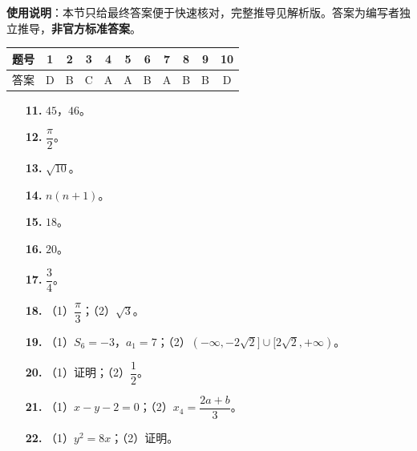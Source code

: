 
\begin{gknotice}
\textbf{使用说明}：本节只给最终答案便于快速核对，完整推导见解析版。答案为编写者独立推导，\textbf{非官方标准答案}。
\end{gknotice}

\begin{center}\begin{tabular}{ccccccccccc}
\toprule
题号 & 1 & 2 & 3 & 4 & 5 & 6 & 7 & 8 & 9 & 10 \\
\midrule
答案 & D & B & C & A & A & B & A & B & B & D \\
\bottomrule
\end{tabular}\end{center}

\begin{itemize}[leftmargin=2.6em]
  \item[\textbf{11.}] $45$，$46$。
  \item[\textbf{12.}] $\dfrac{\pi}{2}$。
  \item[\textbf{13.}] $\sqrt{10}$。
  \item[\textbf{14.}] $n(n+1)$。
  \item[\textbf{15.}] $18$。
  \item[\textbf{16.}] $20$。
  \item[\textbf{17.}] $\dfrac34$。
\end{itemize}

\begin{itemize}[leftmargin=2.6em]
  \item[\textbf{18.}] （1）$\dfrac{\pi}{3}$；（2）$\sqrt3$。
  \item[\textbf{19.}] （1）$S_6=-3$，$a_1=7$；（2）$(-\infty,-2\sqrt2]\cup[2\sqrt2,+\infty)$。
  \item[\textbf{20.}] （1）证明；（2）$\dfrac12$。
  \item[\textbf{21.}] （1）$x-y-2=0$；（2）$x_4=\dfrac{2a+b}{3}$。
  \item[\textbf{22.}] （1）$y^2=8x$；（2）证明。
\end{itemize}
